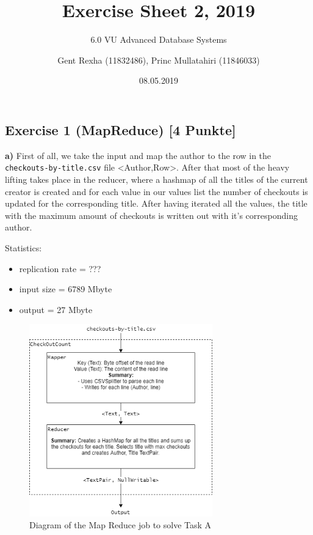\documentclass[]{article}
\title{Exercise Sheet 2, 2019}
\subtitle{6.0 VU Advanced Database Systems}
\author{Gent Rexha (11832486), Princ Mullatahiri (11846033)}
\date{08.05.2019}
\providecommand{\tightlist}{%
  \setlength{\itemsep}{0pt}\setlength{\parskip}{0pt}}
\begin{document}
\maketitle

\hypertarget{exercise-1-mapreduce-4-punkte}{%
\subsection{Exercise 1 (MapReduce) {[}4
Punkte{]}}\label{exercise-1-mapreduce-4-punkte}}

\textbf{a)} First of all, we take the input and map the author to the
row in the \texttt{checkouts-by-title.csv} file
\textless{}Author,Row\textgreater{}. After that most of the heavy
lifting takes place in the reducer, where a hashmap of all the titles of
the current creator is created and for each value in our values list the
number of checkouts is updated for the corresponding title. After having
iterated all the values, the title with the maximum amount of checkouts
is written out with it's corresponding author.

Statistics:

\begin{itemize}
\tightlist
\item
  replication rate = ???
\item
  input size = 6789 Mbyte
\item
  output = 27 Mbyte
\end{itemize}

\begin{figure}[h]

{\centering \includegraphics[width=300px]{images/Exercise_1_Task_A} 

}

\caption{\label{fig:figs}Diagram of the Map Reduce job to solve Task A}\label{fig:unnamed-chunk-1}
\end{figure}
\end{document}

